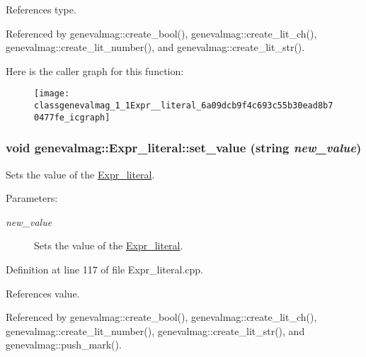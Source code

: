 References type.

Referenced by genevalmag::create\_\-bool(), genevalmag::create\_\-lit\_\-ch(), genevalmag::create\_\-lit\_\-number(), and genevalmag::create\_\-lit\_\-str().

Here is the caller graph for this function:\nopagebreak
\begin{figure}[H]
\begin{center}
\leavevmode
\texttt{[image: classgenevalmag\_1\_1Expr\_\_literal\_6a09dcb9f4c693c55b30ead8b70477fe\_icgraph]}
\end{center}
\end{figure}
\hypertarget{classgenevalmag_1_1Expr__literal_f5e0c53c8df7f902540387c4ff6912e7}{
\subsubsection[{set\_\-value}]{\setlength{\rightskip}{0pt plus 5cm}void genevalmag::Expr\_\-literal::set\_\-value (string {\em new\_\-value})}}
\label{classgenevalmag_1_1Expr__literal_f5e0c53c8df7f902540387c4ff6912e7}


Sets the value of the \hyperlink{classgenevalmag_1_1Expr__literal}{Expr\_\-literal}. \begin{Desc}
\item[Parameters:]
\begin{description}
\item[{\em new\_\-value}]Sets the value of the \hyperlink{classgenevalmag_1_1Expr__literal}{Expr\_\-literal}. \end{description}
\end{Desc}


Definition at line 117 of file Expr\_\-literal.cpp.

References value.

Referenced by genevalmag::create\_\-bool(), genevalmag::create\_\-lit\_\-ch(), genevalmag::create\_\-lit\_\-number(), genevalmag::create\_\-lit\_\-str(), and genevalmag::push\_\-mark().

